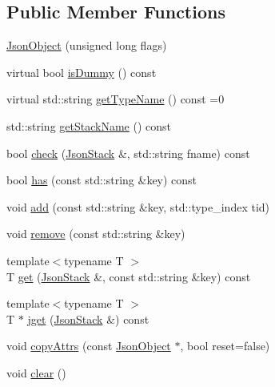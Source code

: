\subsection*{Public Member Functions}
\begin{DoxyCompactItemize}
\item 
\hyperlink{classHurricane_1_1JsonObject_a57d9c022204b30d4b253c2588f2c1215}{Json\+Object} (unsigned long flags)
\item 
virtual bool \hyperlink{classHurricane_1_1JsonObject_a8f0949b75f5900e4ef87196e949cfa6b}{is\+Dummy} () const
\item 
virtual std\+::string \hyperlink{classHurricane_1_1JsonObject_a947e1c3f8dbae63bb2d086b5b827a2a5}{get\+Type\+Name} () const =0
\item 
std\+::string \hyperlink{classHurricane_1_1JsonObject_a34c4e38611238021df8cc69fc32f5e48}{get\+Stack\+Name} () const
\item 
bool \hyperlink{classHurricane_1_1JsonObject_a6ac9230d36590f83fbe1561b6c1bb0e5}{check} (\hyperlink{classHurricane_1_1JsonStack}{Json\+Stack} \&, std\+::string fname) const
\item 
bool \hyperlink{classHurricane_1_1JsonObject_ac0b8816eab2cbcabf18d5421a59aa780}{has} (const std\+::string \&key) const
\item 
void \hyperlink{classHurricane_1_1JsonObject_a39ed04c118b19f1b6010b7f3336c360f}{add} (const std\+::string \&key, std\+::type\+\_\+index tid)
\item 
void \hyperlink{classHurricane_1_1JsonObject_a6435e5a8655a6b42b61d55e7fd673c65}{remove} (const std\+::string \&key)
\item 
{\footnotesize template$<$typename T $>$ }\\T \hyperlink{classHurricane_1_1JsonObject_af599fb8e2f3aca9c00dc628927367cb8}{get} (\hyperlink{classHurricane_1_1JsonStack}{Json\+Stack} \&, const std\+::string \&key) const
\item 
{\footnotesize template$<$typename T $>$ }\\T $\ast$ \hyperlink{classHurricane_1_1JsonObject_a7a3fe903ceb00a3ebff66d1696edf682}{jget} (\hyperlink{classHurricane_1_1JsonStack}{Json\+Stack} \&) const
\item 
void \hyperlink{classHurricane_1_1JsonObject_a380ea9ac8689e1e9cad892edf0024c08}{copy\+Attrs} (const \hyperlink{classHurricane_1_1JsonObject}{Json\+Object} $\ast$, bool reset=false)
\item 
void \hyperlink{classHurricane_1_1JsonObject_a5f11139263926dbd8fe87b9c4480bdae}{clear} ()

\end{DoxyCompactItemize}

